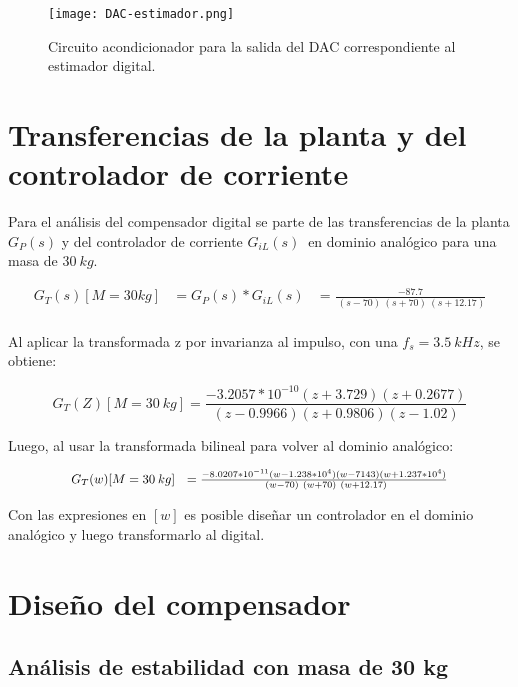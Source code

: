 \begin{figure}[H]
	\centering
	\texttt{[image: DAC-estimador.png]}
	\caption{Circuito acondicionador para la salida del DAC correspondiente al estimador digital.}
	\label{fig:DAC-estimador}
\end{figure}

\section{Transferencias de la planta y del controlador de corriente}

\noindent Para el an\'{a}lisis del compensador digital se parte de las transferencias de la planta $G_P(s)$ y del controlador de corriente $G_{iL}(s)\ $ en dominio anal\'{o}gico para una masa de $30 \:kg$.

\begin{equation} 
	\begin{aligned}
	G_T(s)[M=30kg]&=G_P(s)*G_{iL}(s)&=\frac{-87.7}{\ (s-70)\ (s+70)\ (s+12.17)}\\
	\end{aligned}
\end{equation}

\noindent Al aplicar la transformada z por invarianza al impulso, con una $f_s=3.5\:kHz$, se obtiene:

\begin{equation} 
	G_T(Z)[M=30\:kg] =\frac{-3.2057*10^{-10}(z+3.729)(z+0.2677)}{(z-0.9966)(z+0.9806) (z-1.02)}
\end{equation}

\noindent Luego, al usar la transformada bilineal para volver al dominio anal\'{o}gico:

\begin{equation}
	\resizebox{.8\hsize}{!}
	{
	$G_T(w)[M=30\:kg]\ \ =\frac{-8.0207*10^{-11}(w-1.238*10^4)(w-7143)(w+1.237*10^4)}{\ (w-70)\ (w+70)\ (w+12.17)}$
	}
\end{equation}


\noindent Con las expresiones en $[w]$ es posible diseñar un controlador en el dominio analógico y luego transformarlo al digital.


\section{Diseño del compensador}

\subsection{Análisis de estabilidad con masa de 30 kg}

